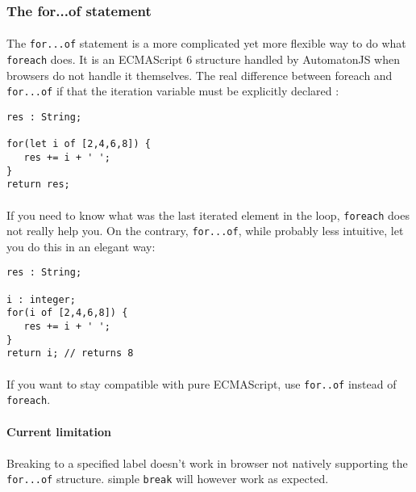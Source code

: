 \documentclass{article}
\let\subsubsubsection\paragraph
\begin{document}
\begin{sloppypar}
      

\subsubsection{ The for...of statement}


\paragraph{}
The \lstinline!for...of! statement is a more complicated yet more flexible way to do what \lstinline!foreach! does. It is an ECMAScript 6 structure handled by AutomatonJS when browsers do not handle it themselves.
         The real difference between foreach and \lstinline!for...of! if that the iteration variable must be explicitly declared :
{\begin{lstlisting}
res : String;

for(let i of [2,4,6,8]) {
   res += i + ' ';
}
return res;
\end{lstlisting}
}


         
\paragraph{}
If you need to know what was the last iterated element in the loop, \lstinline!foreach! does not really help you. On the contrary, \lstinline!for...of!, while probably less intuitive, let you do this in an elegant way:

{\begin{lstlisting}
res : String;

i : integer;
for(i of [2,4,6,8]) {
   res += i + ' ';
}
return i; // returns 8
\end{lstlisting}
}


         
\paragraph{}
If you want to stay compatible with pure ECMAScript, use \lstinline!for..of! instead of \lstinline!foreach!.

         

\subsubsubsection{ Current limitation\\}
\paragraph{}
Breaking to a specified label doesn't work in browser not natively supporting the \lstinline!for...of! structure. simple \lstinline!break! will however work as expected.
         


\end{sloppypar}
\end{document}

